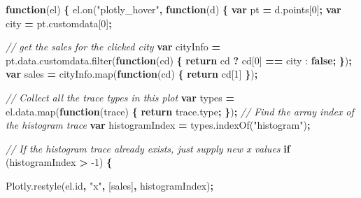 \documentclass[
  12pt,
]{krantz}
\newenvironment{Shaded}{\begin{snugshade}}{\end{snugshade}}
\newcommand{\AttributeTok}[1]{\textcolor[rgb]{0.77,0.63,0.00}{#1}}
\newcommand{\CommentTok}[1]{\textcolor[rgb]{0.56,0.35,0.01}{\textit{#1}}}
\newcommand{\ControlFlowTok}[1]{\textcolor[rgb]{0.13,0.29,0.53}{\textbf{#1}}}
\newcommand{\DecValTok}[1]{\textcolor[rgb]{0.00,0.00,0.81}{#1}}
\newcommand{\KeywordTok}[1]{\textcolor[rgb]{0.13,0.29,0.53}{\textbf{#1}}}
\newcommand{\NormalTok}[1]{#1}
\newcommand{\OperatorTok}[1]{\textcolor[rgb]{0.81,0.36,0.00}{\textbf{#1}}}
\newcommand{\StringTok}[1]{\textcolor[rgb]{0.31,0.60,0.02}{#1}}
\newcommand{\VariableTok}[1]{\textcolor[rgb]{0.00,0.00,0.00}{#1}}
\begin{document}
\begin{Shaded}
\begin{Highlighting}[]
\KeywordTok{function}\NormalTok{(el) }\OperatorTok{\{}
  \VariableTok{el}\NormalTok{.}\AttributeTok{on}\NormalTok{(}\StringTok{"plotly_hover"}\OperatorTok{,} \KeywordTok{function}\NormalTok{(d) }\OperatorTok{\{}
    \KeywordTok{var}\NormalTok{ pt }\OperatorTok{=} \VariableTok{d}\NormalTok{.}\AttributeTok{points}\NormalTok{[}\DecValTok{0}\NormalTok{]}\OperatorTok{;}
    \KeywordTok{var}\NormalTok{ city }\OperatorTok{=} \VariableTok{pt}\NormalTok{.}\AttributeTok{customdata}\NormalTok{[}\DecValTok{0}\NormalTok{]}\OperatorTok{;}

    \CommentTok{// get the sales for the clicked city}
    \KeywordTok{var}\NormalTok{ cityInfo }\OperatorTok{=} \VariableTok{pt}\NormalTok{.}\VariableTok{data}\NormalTok{.}\VariableTok{customdata}\NormalTok{.}\AttributeTok{filter}\NormalTok{(}\KeywordTok{function}\NormalTok{(cd) }\OperatorTok{\{}
      \ControlFlowTok{return}\NormalTok{ cd }\OperatorTok{?}\NormalTok{ cd[}\DecValTok{0}\NormalTok{] }\OperatorTok{==}\NormalTok{ city : }\KeywordTok{false}\OperatorTok{;}
    \OperatorTok{\}}\NormalTok{)}\OperatorTok{;}
    \KeywordTok{var}\NormalTok{ sales }\OperatorTok{=} \VariableTok{cityInfo}\NormalTok{.}\AttributeTok{map}\NormalTok{(}\KeywordTok{function}\NormalTok{(cd) }\OperatorTok{\{} \ControlFlowTok{return}\NormalTok{ cd[}\DecValTok{1}\NormalTok{] }\OperatorTok{\}}\NormalTok{)}\OperatorTok{;}

    \CommentTok{// Collect all the trace types in this plot}
    \KeywordTok{var}\NormalTok{ types }\OperatorTok{=} \VariableTok{el}\NormalTok{.}\VariableTok{data}\NormalTok{.}\AttributeTok{map}\NormalTok{(}\KeywordTok{function}\NormalTok{(trace) }\OperatorTok{\{} \ControlFlowTok{return} \VariableTok{trace}\NormalTok{.}\AttributeTok{type}\OperatorTok{;} \OperatorTok{\}}\NormalTok{)}\OperatorTok{;}
    \CommentTok{// Find the array index of the histogram trace}
    \KeywordTok{var}\NormalTok{ histogramIndex }\OperatorTok{=} \VariableTok{types}\NormalTok{.}\AttributeTok{indexOf}\NormalTok{(}\StringTok{"histogram"}\NormalTok{)}\OperatorTok{;}

    \CommentTok{// If the histogram trace already exists, just supply new x values}
    \ControlFlowTok{if}\NormalTok{ (histogramIndex }\OperatorTok{>} \DecValTok{-1}\NormalTok{) }\OperatorTok{\{}

      \VariableTok{Plotly}\NormalTok{.}\AttributeTok{restyle}\NormalTok{(}\VariableTok{el}\NormalTok{.}\AttributeTok{id}\OperatorTok{,} \StringTok{"x"}\OperatorTok{,}\NormalTok{ [sales]}\OperatorTok{,}\NormalTok{ histogramIndex)}\OperatorTok{;}


\end{Highlighting}
\end{Shaded}
\end{document}
